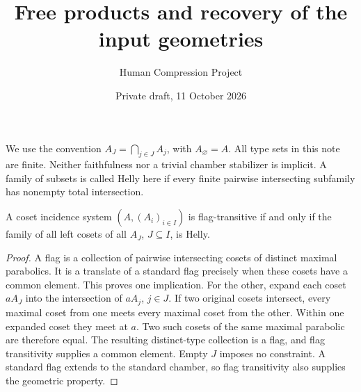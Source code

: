 
\title{Free products and recovery of the input geometries}
\author{Human Compression Project}\date{Private draft, 11 October 2026}
\maketitle
We use the convention $A_J=\bigcap_{j\in J}A_j$, with
$A_\varnothing=A$. All type sets in this note are finite. Neither
faithfulness nor a trivial chamber stabilizer is implicit. A family of
subsets is called Helly here if every finite pairwise intersecting
subfamily has nonempty total intersection.

\begin{lemma}\label{lem:cosets}
A coset incidence system $(A,(A_i)_{i\in I})$ is flag-transitive if
and only if the family of all left cosets of all $A_J$, $J\subseteq I$,
is Helly.
\end{lemma}
\begin{proof}
A flag is a collection of pairwise intersecting cosets of distinct
maximal parabolics. It is a translate of a standard flag precisely
when these cosets have a common element. This proves one implication.
For the other, expand each coset $aA_J$ into the intersection of
$aA_j$, $j\in J$. If two original cosets intersect, every maximal
coset from one meets every maximal coset from the other. Within one
expanded coset they meet at $a$. Two such cosets of the same maximal
parabolic are therefore equal. The resulting distinct-type collection
is a flag, and flag transitivity supplies a common element. Empty
$J$ imposes no constraint. A standard flag extends to the standard
chamber, so flag transitivity also supplies the geometric property.
\end{proof}

